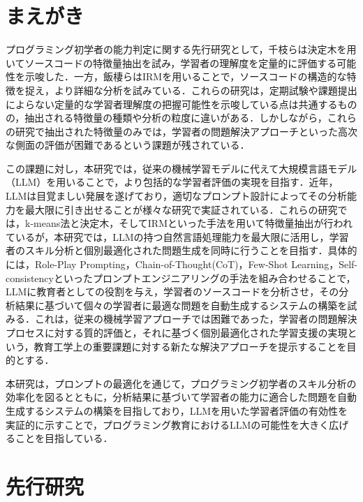 \documentclass[11pt]{jreport}
\begin{document}
\chapter{まえがき}
プログラミング初学者の能力判定に関する先行研究として，千枝ら\cite{chieda}は決定木を用いてソースコードの特徴量抽出を試み，学習者の理解度を定量的に評価する可能性を示唆した．一方，飯棲ら\cite{izumi}はIRMを用いることで，ソースコードの構造的な特徴を捉え，より詳細な分析を試みている．これらの研究は，定期試験や課題提出によらない定量的な学習者理解度の把握可能性を示唆している点は共通するものの，抽出される特徴量の種類や分析の粒度に違いがある．しかしながら，これらの研究で抽出された特徴量のみでは，学習者の問題解決アプローチといった高次な側面の評価が困難であるという課題が残されている．

この課題に対し，本研究では，従来の機械学習モデルに代えて大規模言語モデル（LLM）を用いることで，より包括的な学習者評価の実現を目指す．近年，LLMは目覚ましい発展を遂げており，適切なプロンプト設計によってその分析能力を最大限に引き出せることが様々な研究で実証されている\cite{prompting servey}．これらの研究では，k-means法と決定木，そしてIRMといった手法を用いて特徴量抽出が行われているが，本研究では，LLMの持つ自然言語処理能力を最大限に活用し，学習者のスキル分析と個別最適化された問題生成を同時に行うことを目指す．具体的には，Role-Play Prompting\cite{Role_play}，Chain-of-Thought(CoT)\cite{CoT}，Few-Shot Learning\cite{Few-shot}，Self-consistency\cite{Self-consitency}といったプロンプトエンジニアリングの手法を組み合わせることで，LLMに教育者としての役割を与え，学習者のソースコードを分析させ，その分析結果に基づいて個々の学習者に最適な問題を自動生成するシステムの構築を試みる．これは，従来の機械学習アプローチでは困難であった，学習者の問題解決プロセスに対する質的評価と，それに基づく個別最適化された学習支援の実現という，教育工学上の重要課題に対する新たな解決アプローチを提示することを目的とする．

本研究は，プロンプトの最適化を通じて，プログラミング初学者のスキル分析の効率化を図るとともに，分析結果に基づいて学習者の能力に適合した問題を自動生成するシステムの構築を目指しており，LLMを用いた学習者評価の有効性を実証的に示すことで，プログラミング教育におけるLLMの可能性を大きく広げることを目指している．

\chapter{先行研究}
\end{document}
